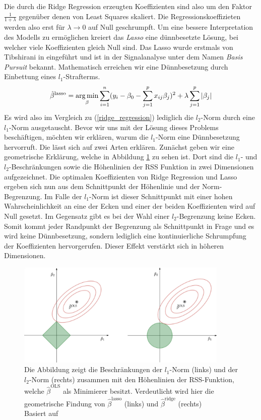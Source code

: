 Die durch die Ridge Regression erzeugten Koeffizienten sind also um den Faktor $\frac{1}{1+\lambda}$ gegenüber denen von Least Squares skaliert. Die Regressionskoeffizieten werden also erst für $\lambda \rightarrow 0$ auf Null geschrumpft. Um eine bessere Interpretation des Modells zu ermöglichen kreiert das \textit{Lasso} eine dünnbesetzte Lösung, bei welcher viele Koeffizienten gleich Null sind. Das Lasso wurde erstmals von Tibshirani in \cite{tibshirani_lasso} eingeführt und ist in der Signalanalyse unter dem Namen \textit{Basis Pursuit} \cite{chen} bekannt. Mathematisch erreichen wir eine Dünnbesetzung durch Einbettung eines $l_1$-Strafterms.
\begin{align}
\label{lasso}
\hat{\beta}^{\text{lasso}} = \operatorname*{arg\,min}_{\beta} \sum_{i=1}^{n}(y_i - \beta_0 - \sum_{j=1}^p x_{ij}\beta_j)^2 + \lambda\sum_{j=1}^p \left|\beta_j\right|
\end{align}
Es wird also im Vergleich zu (\ref{ridge_regression}) lediglich die $l_2$-Norm durch eine $l_1$-Norm ausgetauscht. Bevor wir uns mit der Lösung dieses Problems beschäftigen, möchten wir erklären, warum die $l_1$-Norm eine Dünnbesetzung hervorruft. Die lässt sich auf zwei Arten erklären. Zunächst geben wir eine geometrische Erklärung, welche in Abbildung \ref{lasso_ridge_regression_figure} zu sehen ist. Dort sind die $l_1$- und $l_2$-Beschränkungen sowie die Höhenlinien der RSS Funktion in zwei Dimensionen aufgezeichnet. Die optimalen Koeffizienten von Ridge Regression und Lasso ergeben sich nun aus dem Schnittpunkt der Höhenlinie und der Norm-Begrenzung. Im Falle der $l_1$-Norm ist dieser Schnittpunkt mit einer hohen Wahrscheinlichkeit an eine der Ecken und einer der beiden Koeffizienten wird auf Null gesetzt. Im Gegensatz gibt es bei der Wahl einer $l_2$-Begrenzung keine Ecken. Somit kommt jeder Randpunkt der Begrenzung als Schnittpunkt in Frage und es wird keine Dünnbesetzung, sondern lediglich eine kontinuierliche Schrumpfung der Koeffizienten hervorgerufen. Dieser Effekt verstärkt sich in höheren Dimensionen.

\begin{figure}
\centering
\includegraphics[width = 0.9\textwidth]{figures/lasso_ridge_regression.jpg}
\caption{Die Abbildung zeigt die Beschränkungen der $l_1$-Norm (links) und der $l_2$-Norm (rechts) zusammen mit den Höhenlinien der RSS-Funktion, welche $\hat{\beta}^{\text{OLS}}$ als Minimierer besitzt. Verdeutlicht wird hier die geometrische Findung von $\hat{\beta}^{\text{lasso}}$ (links) und $\hat{\beta}^{\text{ridge}}$ (rechts)\\Basiert auf \cite{hastie_elements}}
\label{lasso_ridge_regression_figure}
\end{figure}

